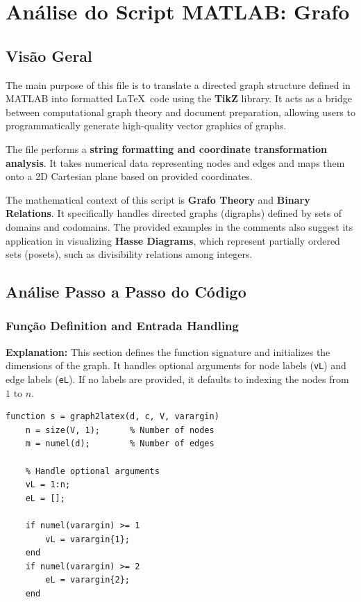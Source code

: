 \chapter{Análise do Script MATLAB: Grafo}

\section{Visão Geral}
The main purpose of this file is to translate a directed graph structure defined in MATLAB into formatted \LaTeX\ code using the \textbf{TikZ} library. It acts as a bridge between computational graph theory and document preparation, allowing users to programmatically generate high-quality vector graphics of graphs.

The file performs a \textbf{string formatting and coordinate transformation analysis}. It takes numerical data representing nodes and edges and maps them onto a 2D Cartesian plane based on provided coordinates.

The mathematical context of this script is \textbf{Grafo Theory} and \textbf{Binary Relations}. It specifically handles directed graphs (digraphs) defined by sets of domains and codomains. The provided examples in the comments also suggest its application in visualizing \textbf{Hasse Diagrams}, which represent partially ordered sets (posets), such as divisibility relations among integers.

\section{Análise Passo a Passo do Código}

\subsection{Função Definition and Entrada Handling}
\textbf{Explanation:} This section defines the function signature and initializes the dimensions of the graph. It handles optional arguments for node labels (\texttt{vL}) and edge labels (\texttt{eL}). If no labels are provided, it defaults to indexing the nodes from $1$ to $n$.
\begin{lstlisting}
function s = graph2latex(d, c, V, varargin)
    n = size(V, 1);      % Number of nodes
    m = numel(d);        % Number of edges

    % Handle optional arguments
    vL = 1:n;
    eL = [];

    if numel(varargin) >= 1
        vL = varargin{1};
    end
    if numel(varargin) >= 2
        eL = varargin{2};
    end
\end{lstlisting}

